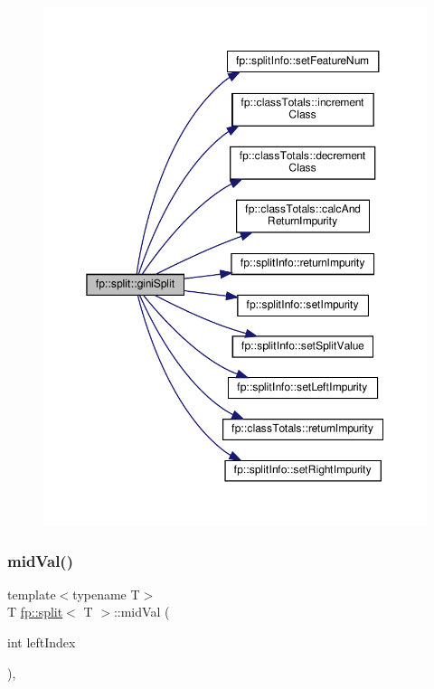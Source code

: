 \begin{figure}[H]
\begin{center}
\leavevmode
\includegraphics[width=350pt]{classfp_1_1split_a6a98f17c8b3fc3b8047e4559f8b618b7_cgraph}
\end{center}
\end{figure}
\mbox{\label{classfp_1_1split_a0a8bc35b7ff78cb96332cdbda12b5fe5}} 
\subsubsection{\texorpdfstring{mid\+Val()}{midVal()}}
{\footnotesize\ttfamily template$<$typename T$>$ \\
T \hyperlink{classfp_1_1split}{fp\+::split}$<$ T $>$\+::mid\+Val (\begin{DoxyParamCaption}\item[{int}]{left\+Index }\end{DoxyParamCaption})\hspace{0.3cm}{\ttfamily [inline]}, {\ttfamily [protected]}}



